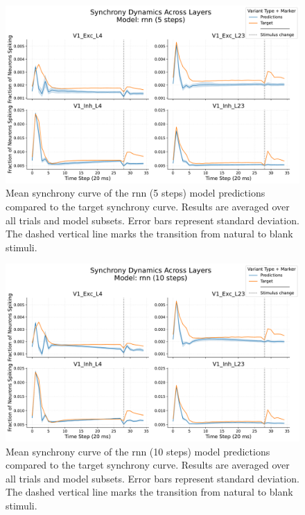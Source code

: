 \begin{figure}
    \centering
    \includegraphics[width=\linewidth]{img/plots/separate_model_synchrony_curve_rnn_separate_5_evaluation.pdf}
    \caption{Mean synchrony curve of the rnn (5 steps) model predictions compared to the target synchrony curve. Results are averaged over all trials and model subsets. Error bars represent standard deviation. The dashed vertical line marks the transition from natural to blank stimuli.}
    \label{fig:synchrony_curve_rnn_5}
\end{figure}

\begin{figure}
    \centering
    \includegraphics[width=\linewidth]{img/plots/separate_model_synchrony_curve_rnn_separate_10_evaluation.pdf}
    \caption{Mean synchrony curve of the rnn (10 steps) model predictions compared to the target synchrony curve. Results are averaged over all trials and model subsets. Error bars represent standard deviation. The dashed vertical line marks the transition from natural to blank stimuli.}
    \label{fig:synchrony_curve_rnn_10}
\end{figure}

